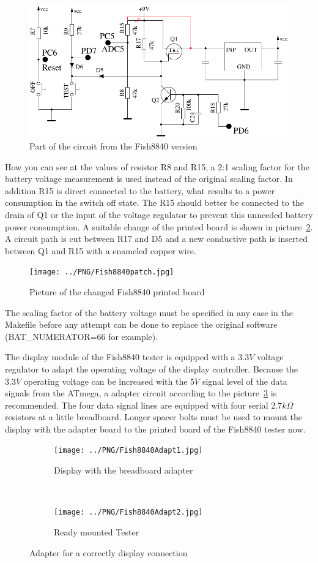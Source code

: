 \begin{figure}[H]
\centering
\includegraphics[width=.698\textwidth]{../FIG/Fish8840.pdf}
\caption{Part of the circuit from the Fish8840 version}
\label{fig:Fish8840}
\end{figure}

How you can see at the values of resistor R8 and R15,
a 2:1 scaling factor for the battery voltage measurement is used instead of the original scaling factor.
In addition R15 is direct connected to the battery, what results to a power consumption in the switch off state.
The R15 should better be connected to the drain of Q1 or the input of the voltage regulator to prevent this
unneeded battery power consumption.
A suitable change of the printed board is shown in picture~\ref{fig:Fish8840patch}.
A circuit path is cut between R17 and D5 and a new conductive path is inserted between Q1 and
R15 with a enameled copper wire.

\begin{figure}[H]
\centering
\texttt{[image: ../PNG/Fish8840patch.jpg]}
\caption{Picture of the changed Fish8840 printed board}
\label{fig:Fish8840patch}
\end{figure}

The scaling factor of the battery voltage must be specified in any case in the Makefile before any
attempt can be done to replace the original software (BAT\_NUMERATOR=66 for example).

The display module of the Fish8840 tester is equipped with a \(3.3V\) voltage regulator to adapt
the operating voltage of the display controller.
Because the \(3.3V\) operating voltage can be increased with the \(5V\) signal level of the data signals
from the ATmega, a adapter circuit according to the picture~\ref{fig:Fish8840Adapt} is recommended.
The four data signal lines are equipped with four serial \(2.7k\Omega\) resistors at a little
breadboard.
Longer spacer bolts must be used to mount the display with the adapter board to the printed board
of the Fish8840 tester now.

\begin{figure}[H]
  \begin{subfigure}[b]{.5\textwidth}
    \centering
    \texttt{[image: ../PNG/Fish8840Adapt1.jpg]}
    \caption{Display with the breadboard adapter}
  \end{subfigure}
  ~
  \begin{subfigure}[b]{.5\textwidth}
    \centering
    \texttt{[image: ../PNG/Fish8840Adapt2.jpg]}
    \caption{Ready mounted Tester}
  \end{subfigure}
  \caption{Adapter for a correctly display connection}
  \label{fig:Fish8840Adapt}
\end{figure}

